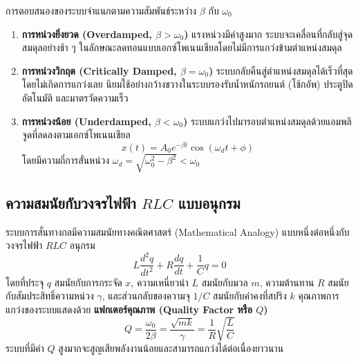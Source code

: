 \begin{mathdefinition}
การตอบสนองของระบบจำแนกตามความสัมพันธ์ระหว่าง $\beta$ กับ $\omega_0$
\begin{enumerate}
    \item \textbf{การหน่วงยิ่งยวด (Overdamped, $\beta > \omega_0$)} แรงหน่วงมีค่าสูงมาก ระบบจะเคลื่อนที่กลับสู่จุดสมดุลอย่างช้า ๆ ในลักษณะลดทอนแบบเอกซ์โพเนนเชียลโดยไม่มีการแกว่งข้ามตำแหน่งสมดุล
    \item \textbf{การหน่วงวิกฤต (Critically Damped, $\beta = \omega_0$)} ระบบกลับคืนสู่ตำแหน่งสมดุลได้เร็วที่สุดโดยไม่เกิดการแกว่งเลย นิยมใช้อย่างกว้างขวางในระบบรองรับน้ำหนักรถยนต์ (โช้กอัพ) ประตูปิดอัตโนมัติ และมาตรวัดความเร็ว
    \item \textbf{การหน่วงน้อย (Underdamped, $\beta < \omega_0$)} ระบบแกว่งไปมารอบตำแหน่งสมดุลด้วยแอมพลิจูดที่ลดลงตามเอกซ์โพเนนเชียล
    \begin{equation}
    x(t) = A_0 e^{-\beta t}\cos(\omega_d t + \phi)
    \end{equation}
    โดยมีความถี่การสั่นหน่วง $\omega_d = \sqrt{\omega_0^2 - \beta^2} < \omega_0$
\end{enumerate}
\end{mathdefinition}

\subsection{ความสมนัยกับวงจรไฟฟ้า \texorpdfstring{$RLC$}{RLC} แบบอนุกรม}
ระบบการสั่นทางกลมีความสมนัยทางคณิตศาสตร์ (Mathematical Analogy) แบบหนึ่งต่อหนึ่งกับวงจรไฟฟ้า $RLC$ อนุกรม
\begin{equation}
L\frac{d^2q}{dt^2} + R\frac{dq}{dt} + \frac{1}{C}q = 0
\end{equation}
โดยที่ประจุ $q$ สมนัยกับการกระจัด $x$, ความเหนี่ยวนำ $L$ สมนัยกับมวล $m$, ความต้านทาน $R$ สมนัยกับสัมประสิทธิ์ความหน่วง $\gamma$, และส่วนกลับของความจุ $1/C$ สมนัยกับค่าคงที่สปริง $k$ คุณภาพการแกว่งของระบบแสดงด้วย \textbf{แฟกเตอร์คุณภาพ (Quality Factor หรือ $Q$)}
\begin{equation}
Q = \frac{\omega_0}{2\beta} = \frac{\sqrt{mk}}{\gamma} = \frac{1}{R}\sqrt{\frac{L}{C}}
\end{equation}
ระบบที่มีค่า $Q$ สูงมากจะสูญเสียพลังงานน้อยและสามารถแกว่งได้ต่อเนื่องยาวนาน

